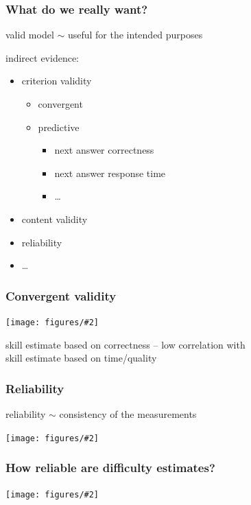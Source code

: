 \documentclass[bigger]{beamer}
\newcommand{\img}[2]{
  \begin{center}
    \texttt{[image: figures/\#2]}
  \end{center}
}
\begin{document}
\begin{frame}
  \frametitle{What do we really want?}
  valid model $\sim$ useful for the intended purposes
  \pause

  \medskip
  indirect evidence:
  \vspace{-0.1cm}
  \begin{itemize}
    \item criterion validity
    \begin{itemize}
      \item convergent
      \item predictive
      \begin{itemize}
        \item \alert{next answer correctness}
        \item next answer response time
        \item \ldots
      \end{itemize}
    \end{itemize}
    \item content validity
    \item reliability
    \item \ldots
  \end{itemize}
\end{frame}


\begin{frame}
  \frametitle{Convergent validity}
  \bigskip
  \img{0.5}{convergent-validity}
  skill estimate based on correctness -- low correlation with\\
  skill estimate based on time/quality
\end{frame}


\begin{frame}
  \frametitle{Reliability}
  \begin{center}
  reliability $\sim$ consistency of the measurements
  \end{center}
  \medskip
  \img{0.7}{targets}
\end{frame}


\begin{frame}
  \frametitle{How reliable are difficulty estimates?}
  \bigskip
  \img{0.9}{reliability-difficulties}
\end{frame}
\end{document}
